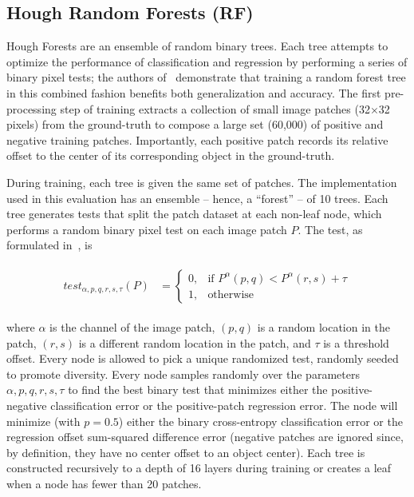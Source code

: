 \subsection{Hough Random Forests (RF)}

Hough Forests are an ensemble of random binary trees.  Each tree attempts to optimize the performance of classification and regression by performing a series of binary pixel tests; the authors of~\cite{gall_class-specific_2009, leibe_robust_2008} demonstrate that training a random forest tree in this combined fashion benefits both generalization and accuracy.  The first pre-processing step of training extracts a collection of small image patches (32$\times$32 pixels) from the ground-truth to compose a large set (60,000) of positive and negative training patches.  Importantly, each positive patch records its relative offset to the center of its corresponding object in the ground-truth.

During training, each tree is given the same set of patches.  The implementation used in this evaluation has an ensemble -- hence, a ``forest'' -- of 10 trees.  Each tree generates tests that split the patch dataset at each non-leaf node, which performs a random binary pixel test on each image patch $P$.  The test, as formulated in~\cite{gall_hough_2011}, is

\begin{align}
    \begin{split}
        test_{\alpha,p,q,r,s,\tau}(P) &=
        \begin{cases}
            0, & \text{if } P^\alpha(p,q) < P^\alpha(r,s) + \tau \\
            1, & \text{otherwise}
        \end{cases}
    \end{split}
\end{align}

\noindent
where $\alpha$ is the channel of the image patch, $(p,q)$ is a random location in the patch, $(r,s)$ is a different random location in the patch, and $\tau$ is a threshold offset.  Every node is allowed to pick a unique randomized test, randomly seeded to promote diversity.  Every node samples randomly over the parameters $\alpha,p,q,r,s,\tau$ to find the best binary test that minimizes either the positive-negative classification error or the positive-patch regression error.  The node will minimize (with $p=0.5$) either the binary cross-entropy classification error or the regression offset sum-squared difference error (negative patches are ignored since, by definition, they have no center offset to an object center).  Each tree is constructed recursively to a depth of 16 layers during training or creates a leaf when a node has fewer than 20 patches.

